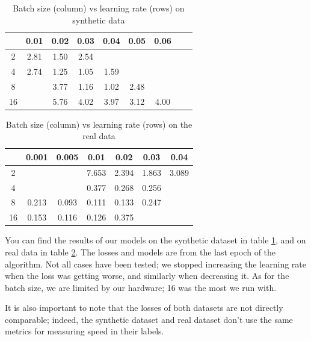 \documentclass[10pt,conference]{IEEEtran}
\begin{document}
\begin{table}[h]
    \centering
    \begin{tabular}{|c || c | c | c | c | c | c| c | c |} 
        \hline
           & 0.01 & 0.02 & 0.03 & 0.04 & 0.05 & 0.06 \\  
        \hline\hline
        2  & 2.81 & 1.50 & 2.54 &      &      &\\ 
        \hline
        4  & 2.74 & 1.25 & 1.05 & 1.59 &      &\\
        \hline
        8  &      & 3.77 & 1.16 & 1.02 & 2.48 &\\
        \hline
        16 &      & 5.76 & 4.02 & 3.97 & 3.12 & 4.00\\
        \hline
    \end{tabular}
    \caption{Batch size (column) vs learning rate (rows) on synthetic data}
\label{table:syntheticDataResults}
\end{table}
\begin{table}[h]
    \centering
     \begin{tabular}{|c || c | c | c | c | c | c| } 
     \hline
        & 0.001& 0.005 & 0.01  & 0.02 & 0.03 & 0.04 \\  
     \hline\hline
     2  &      &       & 7.653 & 2.394& 1.863& 3.089 \\ 
     \hline
     4  &      &       & 0.377 & 0.268& 0.256&  \\
     \hline
     8  & 0.213&  0.093& 0.111 & 0.133& 0.247&  \\
     \hline
     16 & 0.153&  0.116& 0.126 & 0.375&      &  \\
     \hline
    \end{tabular}
    \caption{Batch size (column) vs learning rate (rows) on the real data}
\label{table:realDataResults}
\end{table}


You can find the results of our models on the synthetic dataset in table \ref{table:syntheticDataResults}, and on real data in table \ref{table:realDataResults}. The losses and models are from the last epoch of the algorithm. Not all cases have been tested; we stopped increasing the learning rate when the loss was getting worse, and similarly when decreasing it. As for the batch size, we are limited by our hardware; 16 was the most we run with.\par
It is also important to note that the losses of both datasets are not directly comparable; indeed, the synthetic dataset and real dataset don't use the same metrics for measuring speed in their labels.\par
\end{document}
